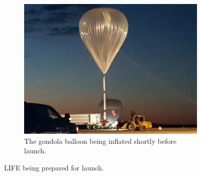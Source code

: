 \begin{figure}
\begin{subfigure}[h]{0.49\textwidth}
        \label{fig:LIFE_on_launchpad}
    \end{subfigure}
    \begin{subfigure}[h]{0.49\textwidth}
        \centering
        \includegraphics[width=\textwidth]{chap4_images/gondola_balloon.jpg}
        \caption{The gondola balloon being inflated shortly before launch.}
        \label{fig:gondola_balloon}
    \end{subfigure}
    \caption{LIFE being prepared for launch.}
    \label{fig:LIFE_BEFORE_LAUNCH}
\end{figure}

